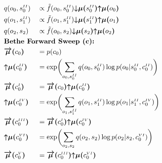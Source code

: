 \documentclass[fleqn]{article}
\begin{document}
\newpage
\noindent
\setlength{\jot}{0.6em}
\begin{minipage}[t]{0.5\textwidth}
    \begin{alignat}{2}
         & q(o_0,s^{\scriptscriptstyle II}_0)                           &  & \propto \tilde{f}(o_0,s^{\scriptscriptstyle II}_0) \bm{{\downarrow}{\mu}(}s^{\scriptscriptstyle II}_0\bm{)} \bm{{\uparrow}{\mu}(}o_0\bm{)}                           \\
         & q(o_1,s^{\scriptscriptstyle II}_1)                           &  & \propto \tilde{f}(o_1,s^{\scriptscriptstyle II}_1) \bm{{\downarrow}{\mu}(}s^{\scriptscriptstyle II}_1\bm{)} \bm{{\uparrow}{\mu}(}o_1\bm{)}                           \\
         & q(o_2,s_2)                                                   &  & \propto \tilde{f}(o_0,s_2) \bm{{\downarrow}{\mu}(}s_2\bm{)} \bm{{\uparrow}{\mu}(}o_2\bm{)}                                                                           \\
         & \rlap{\text{\bfseries Bethe Forward Sweep (c):}} \nonumber                                                                                                                                                                             \\
         & \bm{\overrightarrow{\mu}(}c_0\bm{)}                          &  & = p(c_0)                                                                                                                                                             \\
         & \bm{{\uparrow}{\mu}(}c^{\scriptscriptstyle II}_0\bm{)}       &  & = \exp \biggl( \sum_{o_0,s^{\scriptscriptstyle II}_0} q(o_0,s^{\scriptscriptstyle II}_0) \log p(o_0|s^{\scriptscriptstyle II}_0,c^{\scriptscriptstyle II}_0) \biggr) \\
         & \bm{\overrightarrow{\mu}(}c^{\scriptscriptstyle I}_0\bm{)}   &  & = \bm{\overrightarrow{\mu}(}c_0\bm{)} \bm{{\uparrow}{\mu}(}c^{\scriptscriptstyle II}_0\bm{)}                                                                         \\
         & \bm{{\uparrow}{\mu}(}c^{\scriptscriptstyle IV}_0\bm{)}       &  & = \exp \biggl( \sum_{o_1,s^{\scriptscriptstyle II}_1} q(o_1,s^{\scriptscriptstyle II}_1) \log p(o_1|s^{\scriptscriptstyle II}_1,c^{\scriptscriptstyle IV}_0) \biggr) \\
         & \bm{\overrightarrow{\mu}(}c^{\scriptscriptstyle III}_0\bm{)} &  & = \bm{\overrightarrow{\mu}(}c^{\scriptscriptstyle I}_0\bm{)} \bm{{\uparrow}{\mu}(}c^{\scriptscriptstyle IV}_0\bm{)}                                                  \\
         & \bm{{\uparrow}{\mu}(}c^{\scriptscriptstyle VI}_0\bm{)}       &  & = \exp \biggl( \sum_{o_2,s_2} q(o_2,s_2) \log p(o_2|s_2,c^{\scriptscriptstyle VI}_0) \biggr)                                                                         \\
         & \bm{\overrightarrow{\mu}(}c^{\scriptscriptstyle V}_0\bm{)}   &  & = \bm{\overrightarrow{\mu}(}c^{\scriptscriptstyle III}_0\bm{)} \bm{{\uparrow}{\mu}(}c^{\scriptscriptstyle VI}_0\bm{)}
    \end{alignat}
\end{minipage}
\end{document}
